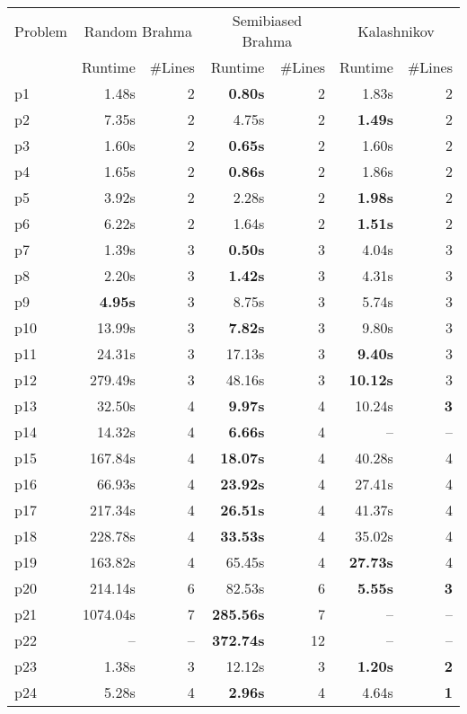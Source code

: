 \begin{tabular}{l||rr|rr|rr}
Problem & \multicolumn{2}{c}{Random {\sc Brahma}} & \multicolumn{2}{|c}{Semibiased {\sc Brahma}} & \multicolumn{2}{|c}{\sc Kalashnikov} \\
        & Runtime & \#Lines & Runtime & \#Lines & Runtime & \#Lines \\
\hline
\hline
p1 & 1.48s &2 &{\bf 0.80s} &2 &1.83s &2 \\
p2 & 7.35s &2 &4.75s &2 &{\bf 1.49s} &2 \\
p3 & 1.60s &2 &{\bf 0.65s} &2 &1.60s &2 \\
p4 & 1.65s &2 &{\bf 0.86s} &2 &1.86s &2 \\
p5 & 3.92s &2 &2.28s &2 &{\bf 1.98s} &2 \\
p6 & 6.22s &2 &1.64s &2 &{\bf 1.51s} &2 \\
p7 & 1.39s &3 &{\bf 0.50s} &3 &4.04s &3 \\
p8 & 2.20s &3 &{\bf 1.42s} &3 &4.31s &3 \\
p9 & {\bf 4.95s} &3 &8.75s &3 &5.74s &3 \\
p10 & 13.99s &3 &{\bf 7.82s} &3 &9.80s &3 \\
p11 & 24.31s &3 &17.13s &3 &{\bf 9.40s} &3 \\
p12 & 279.49s &3 &48.16s &3 &{\bf 10.12s} &3 \\
p13 & 32.50s &4 &{\bf 9.97s} &4 &10.24s &{\bf 3} \\
p14 & 14.32s &4 &{\bf 6.66s} &4 &-- &-- \\
p15 & 167.84s &4 &{\bf 18.07s} &4 &40.28s &4 \\
p16 & 66.93s &4 &{\bf 23.92s} &4 &27.41s &4 \\
p17 & 217.34s &4 &{\bf 26.51s} &4 &41.37s &4 \\
p18 & 228.78s &4 &{\bf 33.53s} &4 &35.02s &4 \\
p19 & 163.82s &4 &65.45s &4 &{\bf 27.73s} &4 \\
p20 & 214.14s &6 &82.53s &6 &{\bf 5.55s} &{\bf 3} \\
p21 & 1074.04s &7 &{\bf 285.56s} &7 &-- &-- \\
p22 & -- &-- &{\bf 372.74s} &12 &-- &-- \\
p23 & 1.38s &3 &12.12s &3 &{\bf 1.20s} &{\bf 2} \\
p24 & 5.28s &4 &{\bf 2.96s} &4 &4.64s &{\bf 1} \\
\end{tabular}
